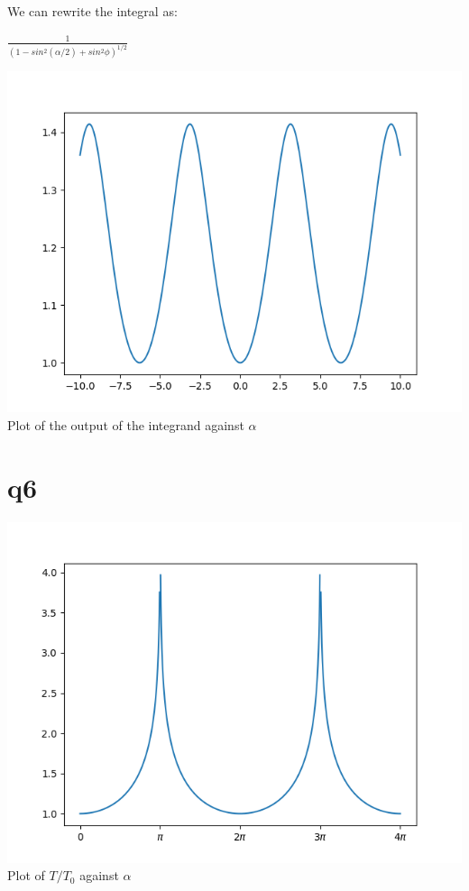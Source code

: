 \documentclass[a4paper,english]{article}
\begin{document}
    We can rewrite the integral as:
    \begin{center}
        $\frac{1}{(1-sin^2(\alpha/2) + sin^2\phi)^{1/2}}$
    \end{center}
    
    
    \begin{center}
        \includegraphics[scale=0.8]{./3_5_2.png}
        Plot of the output of the integrand against $\alpha$
    \end{center}
    \section{q6}
      
    \begin{center}
        \includegraphics[scale=0.8]{./3_6.png}
        Plot of $T/T_0$ against $\alpha$
    \end{center}
\end{document}
